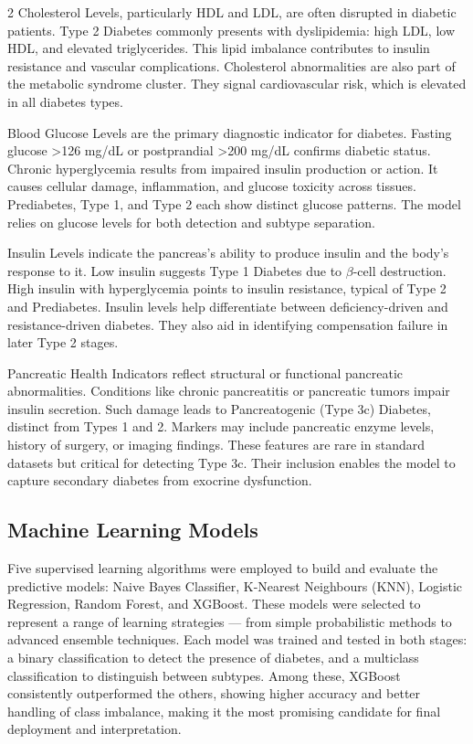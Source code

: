 \documentclass{article}
\begin{document}
\begin{multicols}{2}
Cholesterol Levels, particularly HDL and LDL, are often disrupted in diabetic patients.
Type 2 Diabetes commonly presents with dyslipidemia: high LDL, low HDL, and elevated triglycerides.
This lipid imbalance contributes to insulin resistance and vascular complications.
Cholesterol abnormalities are also part of the metabolic syndrome cluster.
They signal cardiovascular risk, which is elevated in all diabetes types.

Blood Glucose Levels are the primary diagnostic indicator for diabetes.
Fasting glucose >126 mg/dL or postprandial >200 mg/dL confirms diabetic status.
Chronic hyperglycemia results from impaired insulin production or action.
It causes cellular damage, inflammation, and glucose toxicity across tissues.
Prediabetes, Type 1, and Type 2 each show distinct glucose patterns.
The model relies on glucose levels for both detection and subtype separation.

Insulin Levels indicate the pancreas’s ability to produce insulin and the body’s response to it.
Low insulin suggests Type 1 Diabetes due to $\beta$-cell destruction.
High insulin with hyperglycemia points to insulin resistance, typical of Type 2 and Prediabetes.
Insulin levels help differentiate between deficiency-driven and resistance-driven diabetes.
They also aid in identifying compensation failure in later Type 2 stages.

Pancreatic Health Indicators reflect structural or functional pancreatic abnormalities.
Conditions like chronic pancreatitis or pancreatic tumors impair insulin secretion.
Such damage leads to Pancreatogenic (Type 3c) Diabetes, distinct from Types 1 and 2.
Markers may include pancreatic enzyme levels, history of surgery, or imaging findings.
These features are rare in standard datasets but critical for detecting Type 3c.
Their inclusion enables the model to capture secondary diabetes from exocrine dysfunction.


\subsection{Machine Learning Models}
Five supervised learning algorithms were employed to build and evaluate the predictive models: Naive Bayes Classifier, K-Nearest Neighbours (KNN), Logistic Regression, Random Forest, and XGBoost. These models were selected to represent a range of learning strategies — from simple probabilistic methods to advanced ensemble techniques. Each model was trained and tested in both stages: a binary classification to detect the presence of diabetes, and a multiclass classification to distinguish between subtypes. Among these, XGBoost consistently outperformed the others, showing higher accuracy and better handling of class imbalance, making it the most promising candidate for final deployment and interpretation.



\end{multicols}
\end{document}
